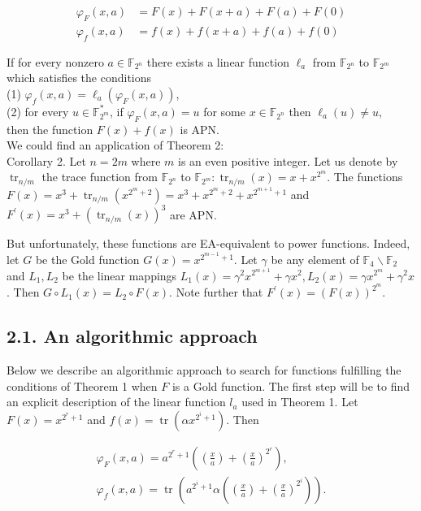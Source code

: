 \documentclass[10pt]{article}
\begin{document}
$$
\begin{aligned}
\varphi_{F}(x, a) & =F(x)+F(x+a)+F(a)+F(0) \\
\varphi_{f}(x, a) & =f(x)+f(x+a)+f(a)+f(0)
\end{aligned}
$$

If for every nonzero $a \in \mathbb{F}_{2^{n}}$ there exists a linear function $\ell_{a}$ from $\mathbb{F}_{2^{n}}$ to $\mathbb{F}_{2^{m}}$ which satisfies the conditions\\
(1) $\varphi_{f}(x, a)=\ell_{a}\left(\varphi_{F}(x, a)\right)$,\\
(2) for every $u \in \mathbb{F}_{2^{m}}^{*}$, if $\varphi_{F}(x, a)=u$ for some $x \in \mathbb{F}_{2^{n}}$ then $\ell_{a}(u) \neq u$,\\
then the function $F(x)+f(x)$ is APN.\\
We could find an application of Theorem 2:\\
Corollary 2. Let $n=2 m$ where $m$ is an even positive integer. Let us denote by $\operatorname{tr}_{n / m}$ the trace function from $\mathbb{F}_{2^{n}}$ to $\mathbb{F}_{2^{m}}: \operatorname{tr}_{n / m}(x)=x+x^{2^{m}}$. The functions $F(x)=x^{3}+\operatorname{tr}_{n / m}\left(x^{2^{m}+2}\right)=x^{3}+x^{2^{m}+2}+x^{2^{m+1}+1}$ and $F^{\prime}(x)= x^{3}+\left(\operatorname{tr}_{n / m}(x)\right)^{3}$ are APN.

But unfortunately, these functions are EA-equivalent to power functions. Indeed, let $G$ be the Gold function $G(x)=x^{2^{m-1}+1}$. Let $\gamma$ be any element of $\mathbb{F}_{4} \backslash \mathbb{F}_{2}$ and $L_{1}, L_{2}$ be the linear mappings $L_{1}(x)= \gamma^{2} x^{2^{m+1}}+\gamma x^{2}, L_{2}(x)=\gamma x^{2^{m}}+\gamma^{2} x$. Then $G \circ L_{1}(x)=L_{2} \circ F(x)$. Note further that $F^{\prime}(x)=(F(x))^{2^{m}}$.

\subsection*{2.1. An algorithmic approach}
Below we describe an algorithmic approach to search for functions fulfilling the conditions of Theorem 1 when $F$ is a Gold function. The first step will be to find an explicit description of the linear function $l_{a}$ used in Theorem 1. Let $F(x)=x^{2^{r}+1}$ and $f(x)=\operatorname{tr}\left(\alpha x^{2^{i}+1}\right)$. Then

$$
\begin{gathered}
\varphi_{F}(x, a)=a^{2^{r}+1}\left(\left(\frac{x}{a}\right)+\left(\frac{x}{a}\right)^{2^{r}}\right), \\
\varphi_{f}(x, a)=\operatorname{tr}\left(a^{2^{i}+1} \alpha\left(\left(\frac{x}{a}\right)+\left(\frac{x}{a}\right)^{2^{i}}\right)\right) .
\end{gathered}
$$
\end{document}
